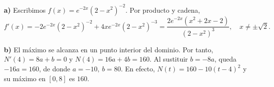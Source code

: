 \textbf{a)} Escribimos $f(x)=e^{-2x}(2-x^2)^{-2}$. Por producto y cadena,
\[
f'(x)=-2e^{-2x}(2-x^2)^{-2}+4xe^{-2x}(2-x^2)^{-3}
=\frac{2e^{-2x}(x^2+2x-2)}{(2-x^2)^3},
\quad x\ne\pm\sqrt2.
\]

\textbf{b)} El máximo se alcanza en un punto interior del dominio. Por tanto, $N'(4)=8a+b=0$ y $N(4)=16a+4b=160$. Al sustituir $b=-8a$, queda $-16a=160$, de donde $\boxed{a=-10,\ b=80}$. En efecto, $N(t)=160-10(t-4)^2$ y su máximo en $[0,8]$ es $160$.
